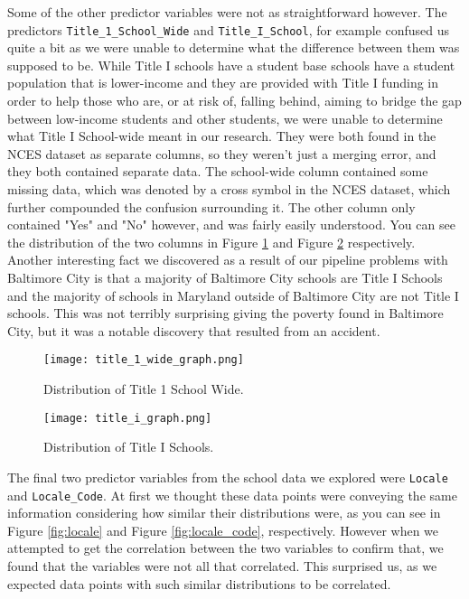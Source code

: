 \documentclass[12pt]{article}
\begin{document}
Some of the other predictor variables were not as straightforward however. The
predictors \texttt{Title\_1\_School\_Wide} and \texttt{Title\_I\_School},
for example confused us quite a bit as we were unable to determine what the 
difference between them was supposed to be. While Title I schools have a student
base schools have a student population that is lower-income and they are provided 
with Title I  funding in order to help those who are, or at risk of, falling behind, 
aiming to bridge the gap between low-income students and other students, we
were unable to determine what Title I School-wide meant in our research. They 
were both found in the NCES dataset as separate columns, so they weren't just a 
merging error, and they both contained separate data.\cite{nces2019} The school-wide 
column contained some missing data, which was denoted by a cross symbol in the 
NCES dataset, which further compounded the confusion surrounding it. The
other column only contained "Yes" and "No" however, and was fairly easily understood.
You can see the distribution of the two columns in Figure \ref{fig:title_1_wide}
and Figure \ref{fig:title_i} respectively.\\

Another interesting fact we discovered as a result of our pipeline problems with
Baltimore City is that a majority of Baltimore City schools are Title I Schools
and the majority of schools in Maryland outside of Baltimore City are not Title
I schools. This was not terribly surprising giving the poverty found in Baltimore
City, but it was a notable discovery that resulted from an accident.\\

\begin{figure}[!htb]
  \centering
  \texttt{[image: title\_1\_wide\_graph.png]}
  \caption{Distribution of Title 1 School Wide.}
  \label{fig:title_1_wide}
\end{figure}

\begin{figure}[!htb]
  \centering
  \texttt{[image: title\_i\_graph.png]}
  \caption{Distribution of Title I Schools.}
  \label{fig:title_i}
\end{figure}

The final two predictor variables from the school data we explored were \texttt{Locale}
and \texttt{Locale\_Code}. At first we thought these data points were conveying the
same information considering how similar their distributions were, as you can see in
Figure \ref{fig:locale} and Figure \ref{fig:locale_code}, respectively. However when
we attempted to get the correlation between the two variables to confirm that, we found
that the variables were not all that correlated. This surprised us, as we expected data
points with such similar distributions to be correlated.\\
\end{document}
